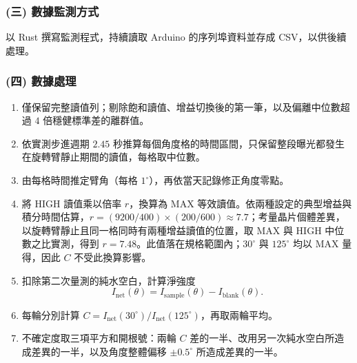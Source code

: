 \subsubsection*{(三) 數據監測方式}
以 Rust 撰寫監測程式，持續讀取 Arduino 的序列埠資料並存成 CSV，以供後續處理。

\subsubsection*{(四) 數據處理}
\begin{enumerate}
    \item 僅保留完整讀值列；剔除飽和讀值、增益切換後的第一筆，以及偏離中位數超過 $4$ 倍穩健標準差的離群值。
    \item 依實測步進週期 $2.45$ 秒推算每個角度格的時間區間，只保留整段曝光都發生在旋轉臂靜止期間的讀值，每格取中位數。
    \item 由每格時間推定臂角（每格 $1^\circ$），再依當天記錄修正角度零點。
    \item 將 HIGH 讀值乘以倍率 $r$，換算為 MAX 等效讀值。依兩種設定的典型增益與積分時間估算，$r=(9200/400)\times(200/600)\approx7.7$；考量晶片個體差異，以旋轉臂靜止且同一格同時有兩種增益讀值的位置，取 MAX 與 HIGH 中位數之比實測，得到 $r=7.48$。此值落在規格範圍內；$30^\circ$ 與 $125^\circ$ 均以 MAX 量得，因此 $C$ 不受此換算影響。
    \item 扣除第二次量測的純水空白，計算淨強度
    \[
        I_{\mathrm{net}}(\theta)=I_{\mathrm{sample}}(\theta)-I_{\mathrm{blank}}(\theta).
    \]
    \item 每輪分別計算 $C=I_{\mathrm{net}}(30^\circ)/I_{\mathrm{net}}(125^\circ)$，再取兩輪平均。
    \item 不確定度取三項平方和開根號：兩輪 $C$ 差的一半、改用另一次純水空白所造成差異的一半，以及角度整體偏移 $\pm0.5^\circ$ 所造成差異的一半。
\end{enumerate}